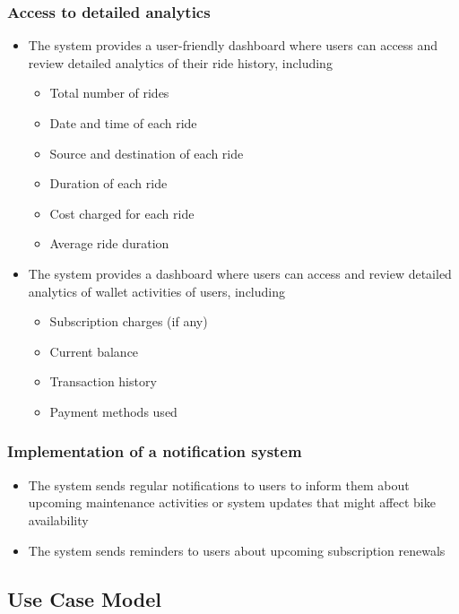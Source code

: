 \documentclass[11pt]{article}
\begin{document}
\subsubsection{Access to detailed analytics}
\begin{itemize}
    \item The system provides a user-friendly dashboard where users can access and review detailed analytics of their ride history, including
    \begin{itemize}[label={*}]
        \item Total number of rides
        \item Date and time of each ride
        \item Source and destination of each ride
        \item Duration of each ride
        \item Cost charged for each ride
        \item Average ride duration
    \end{itemize}
    \item The system provides a dashboard where users can access and review detailed analytics of wallet activities of users, including
    \begin{itemize}[label={*}]
        \item Subscription charges (if any)
        \item Current balance
        \item Transaction history
        \item Payment methods used
    \end{itemize}
\end{itemize}

\subsubsection{Implementation of a notification system}
\begin{itemize}
    \item The system sends regular notifications to users to inform them about upcoming maintenance activities or system updates that might affect bike availability
    \item The system sends reminders to users about upcoming subscription renewals
\end{itemize}
\newpage
\subsection{Use Case Model}
\end{document}
